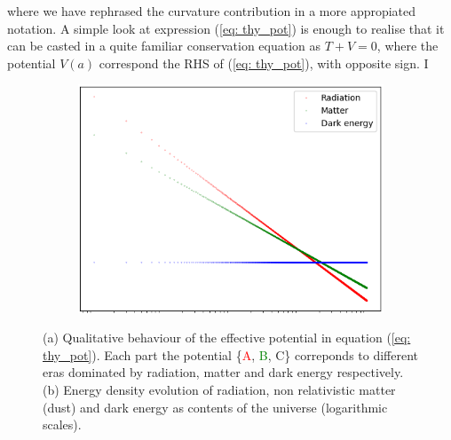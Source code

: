 \documentclass[11pt, a4paper]{article} %
\begin{document}
where we have rephrased the curvature contribution in a more appropiated notation. A simple look at expression (\ref{eq: thy_pot}) is enough to realise that it can be casted in a quite familiar conservation equation as $T + V = 0$, where the potential $V(a)$ correspond the RHS of (\ref{eq: thy_pot}), with opposite sign. I

\vspace{0.5cm} %
\begin{figure}[h!]
	\begin{subfigure}{.49\textwidth}
	  \centering
	  
	  \caption{}
	
	\end{subfigure}
	\begin{subfigure}{.5\textwidth}
	  \centering
	  \includegraphics[scale=0.52]{../Figures/Svgs/den.png}
	  \caption{}
	\end{subfigure}
	\caption{(a) Qualitative behaviour of the effective potential in equation (\ref{eq: thy_pot}). Each part the potential \{\textcolor{red}{A}, \textcolor{green}{B}, C\} correponds to different eras dominated by radiation, matter and dark energy respectively. (b) Energy density evolution of radiation, non relativistic matter (dust) and dark energy as contents of the universe (logarithmic scales).}
	\label{Fig: classical_cosmo_pot}
	\end{figure}
\end{document}
